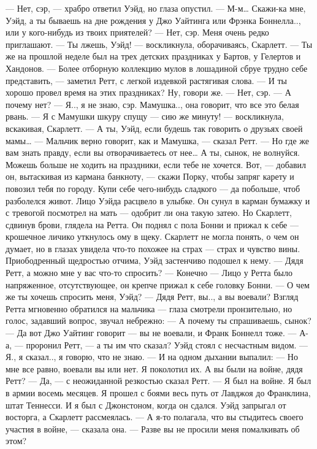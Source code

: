 — Нет, сэр, — храбро ответил Уэйд, но глаза опустил.
— М-м… Скажи-ка мне, Уэйд, а ты бываешь на дне рождения у Джо Уайтинга или Фрэнка Боннелла.., или у кого-нибудь из твоих приятелей?
— Нет, сэр. Меня очень редко приглашают.
— Ты лжешь, Уэйд! — воскликнула, оборачиваясь, Скарлетт. — Ты же на прошлой неделе был на трех детских праздниках у Бартов, у Гелертов и Хандонов. — Более отборную коллекцию мулов в лошадиной сбруе трудно себе представить, — заметил Ретт, с легкой издевкой растягивая слова. — И ты хорошо провел время на этих праздниках? Ну, говори же.
— Нет, сэр.
— А почему нет?
— Я.., я не знаю, сэр. Мамушка.., она говорит, что все это белая рвань.
— Я с Мамушки шкуру спущу — сию же минуту! — воскликнула, вскакивая, Скарлетт. — А ты, Уэйд, если будешь так говорить о друзьях своей мамы…
— Мальчик верно говорит, как и Мамушка, — сказал Ретт. — Но где же вам знать правду, если вы отворачиваетесь от нее… А ты, сынок, не волнуйся. Можешь больше не ходить на праздники, если тебе не хочется. Вот, — добавил он, вытаскивая из кармана банкноту, — скажи Порку, чтобы запряг карету и повозил тебя по городу. Купи себе чего-нибудь сладкого — да побольше, чтоб разболелся живот.
Лицо Уэйда расцвело в улыбке. Он сунул в карман бумажку и с тревогой посмотрел на мать — одобрит ли она такую затею. Но Скарлетт, сдвинув брови, глядела на Ретта. Он поднял с пола Бонни и прижал к себе — крошечное личико уткнулось ому в щеку. Скарлетт не могла понять, о чем он думает, но в глазах увидела что-то похожее на страх — страх и чувство вины.
Приободренный щедростью отчима, Уэйд застенчиво подошел к нему.
— Дядя Ретт, а можно мне у вас что-то спросить?
— Конечно — Лицо у Ретта было напряженное, отсутствующее, он крепче прижал к себе головку Бонни. — О чем же ты хочешь спросить меня, Уэйд?
— Дядя Ретт, вы.., а вы воевали?
Взгляд Ретта мгновенно обратился на мальчика — глаза смотрели пронзительно, но голос, задавший вопрос, звучал небрежно:
— А почему ты спрашиваешь, сынок?
— Да вот Джо Уайтинг говорит — вы не воевали, и Франк Боннелл тоже.
— А-а, — проронил Ретт, — а ты им что сказал? Уэйд стоял с несчастным видом.
— Я., я сказал.., я говорю, что не знаю. — И на одном дыхании выпалил: — Но мне все равно, воевали вы или нет. Я поколотил их. А вы были на войне, дядя Ретт?
— Да, — с неожиданной резкостью сказал Ретт. — Я был на войне. Я был в армии восемь месяцев. Я прошел с боями весь путь от Лавджоя до Франклина, штат Теннесси. И я был с Джонстоном, когда он сдался.
Уэйд запрыгал от восторга, а Скарлетт рассмеялась.
— А я-то полагала, что вы стыдитесь своего участия в войне, — сказала она. — Разве вы не просили меня помалкивать об этом?
